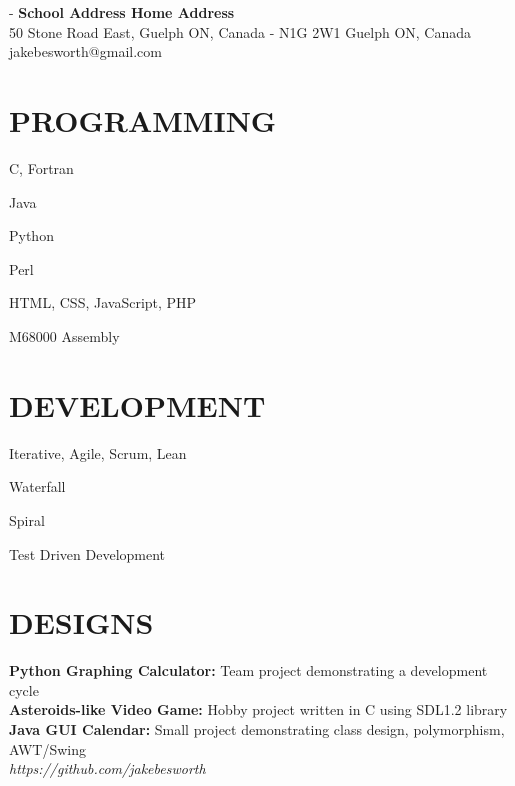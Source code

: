 \documentclass[line, margin]{res}
\begin{document}

\begin{resume}

\section{}
 -\sectionwidth \resumewidth
{\small{\textbf{School Address \hfill Home Address}}\\}
{\color{darkgrey}\small {50 Stone Road East, Guelph ON, Canada -  N1G 2W1} \hfill {Guelph ON, Canada}\\}
{\color{darkgrey} \hfill {jakebesworth@gmail.com\\}}

\section{PROGRAMMING}
\begin{itemize}
{\color{darkgrey}\item C, Fortran
\item Java
\item Python
\item Perl
\item HTML, CSS, JavaScript, PHP
\item M68000 Assembly\\}
\end{itemize}

\section{DEVELOPMENT}
\begin{itemize}
{\color{darkgrey}\item Iterative, Agile, Scrum, Lean
\item Waterfall
\item Spiral
\item Test Driven Development}
\end{itemize}

\section{DESIGNS}
{\color{darkgrey}\textbf{Python Graphing Calculator:} Team project demonstrating a development cycle\\ [10pt]
\textbf{Asteroids-like Video Game:} Hobby project written in C using SDL1.2 library\\ [10pt]
\textbf{Java GUI Calendar:} Small project demonstrating class design, polymorphism, AWT/Swing\\ [10pt]
\textit{https://github.com/jakebesworth\\}}


\end{resume}
\end{document}
